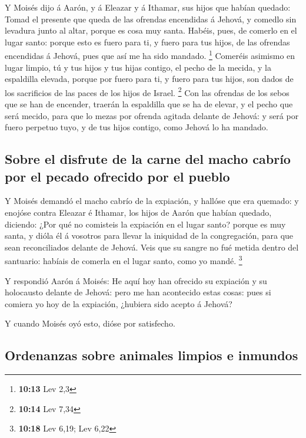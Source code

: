  Y Moisés dijo á Aarón, y á Eleazar y á Ithamar, sus
hijos que habían quedado: Tomad el presente que queda de las ofrendas
encendidas á Jehová, y comedlo sin levadura junto al altar, porque es
cosa muy santa.  Habéis, pues, de comerlo en el lugar
santo: porque esto es fuero para ti, y fuero para tus hijos, de las
ofrendas encendidas á Jehová, pues que así me ha sido mandado.
\footnote{\textbf{10:13} Lev 2,3}  Comeréis asimismo en
lugar limpio, tú y tus hijos y tus hijas contigo, el pecho de la mecida,
y la espaldilla elevada, porque por fuero para ti, y fuero para tus
hijos, son dados de los sacrificios de las paces de los hijos de Israel.
\footnote{\textbf{10:14} Lev 7,34}  Con las ofrendas de
los sebos que se han de encender, traerán la espaldilla que se ha de
elevar, y el pecho que será mecido, para que lo mezas por ofrenda
agitada delante de Jehová: y será por fuero perpetuo tuyo, y de tus
hijos contigo, como Jehová lo ha mandado.

\hypertarget{sobre-el-disfrute-de-la-carne-del-macho-cabruxedo-por-el-pecado-ofrecido-por-el-pueblo}{%
\subsection{Sobre el disfrute de la carne del macho cabrío por el pecado
ofrecido por el
pueblo}\label{sobre-el-disfrute-de-la-carne-del-macho-cabruxedo-por-el-pecado-ofrecido-por-el-pueblo}}

 Y Moisés demandó el macho cabrío de la expiación, y
hallóse que era quemado: y enojóse contra Eleazar é Ithamar, los hijos
de Aarón que habían quedado, diciendo:  ¿Por qué no
comisteis la expiación en el lugar santo? porque es muy santa, y dióla
él á vosotros para llevar la iniquidad de la congregación, para que sean
reconciliados delante de Jehová.  Veis que su sangre no
fué metida dentro del santuario: habíais de comerla en el lugar santo,
como yo mandé. \footnote{\textbf{10:18} Lev 6,19; Lev 6,22}

 Y respondió Aarón á Moisés: He aquí hoy han ofrecido su
expiación y su holocausto delante de Jehová: pero me han acontecido
estas cosas: pues si comiera yo hoy de la expiación, ¿hubiera sido
acepto á Jehová?

 Y cuando Moisés oyó esto, dióse por satisfecho.

\hypertarget{ordenanzas-sobre-animales-limpios-e-inmundos}{%
\subsection{Ordenanzas sobre animales limpios e
inmundos}\label{ordenanzas-sobre-animales-limpios-e-inmundos}}

